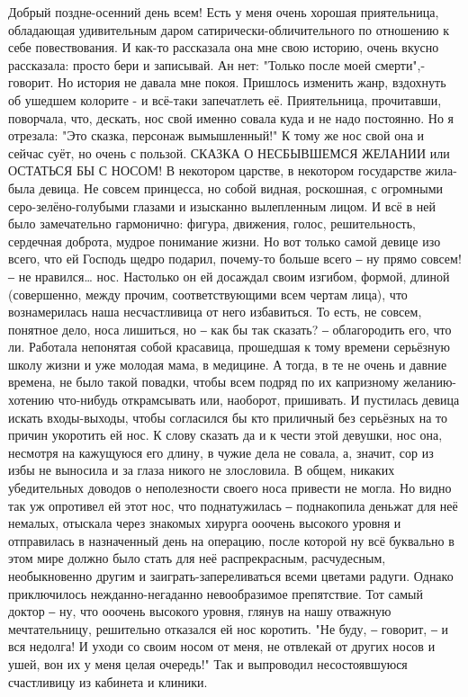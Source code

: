 Добрый поздне-осенний день всем!
Есть у меня очень хорошая приятельница, обладающая удивительным даром сатирически-обличительного по отношению к себе повествования. И как-то рассказала она мне свою историю, очень вкусно рассказала: просто бери и записывай. Ан нет: "Только после моей смерти",- говорит. Но история не давала мне покоя. Пришлось изменить жанр, вздохнуть об ушедшем колорите - и всё-таки запечатлеть её. Приятельница, прочитавши, поворчала, что, дескать, нос свой именно совала куда и не надо постоянно. Но я отрезала: "Это сказка, персонаж вымышленный!" К тому же нос свой она и сейчас суёт, но очень с пользой.
СКАЗКА О НЕСБЫВШЕМСЯ ЖЕЛАНИИ или ОСТАТЬСЯ БЫ С НОСОМ! 
В некотором царстве, в некотором государстве жила-была девица. Не совсем принцесса, но собой видная, роскошная, с огромными серо-зелёно-голубыми глазами и изысканно вылепленным лицом. И всё в ней было замечательно гармонично: фигура, движения, голос, решительность, сердечная доброта, мудрое понимание жизни. 
Но вот только самой девице изо всего, что ей Господь щедро подарил, почему-то больше всего ‒ ну прямо совсем! ‒ не нравился… нос. Настолько он ей досаждал своим изгибом, формой, длиной (совершенно, между прочим, соответствующими всем чертам лица), что вознамерилась наша несчастливица от него избавиться. То есть, не совсем, понятное дело, носа лишиться, но ‒ как бы так сказать? ‒ облагородить его, что ли. 
Работала непонятая собой красавица, прошедшая к тому времени серьёзную школу жизни и уже молодая мама, в медицине. А тогда, в те не очень и давние времена, не было такой повадки, чтобы всем подряд по их капризному желанию-хотению что-нибудь открамсывать или, наоборот, пришивать. И пустилась девица искать входы-выходы, чтобы согласился бы кто приличный без серьёзных на то причин укоротить ей нос. К слову сказать да и к чести этой девушки, нос она, несмотря на кажущуюся его длину, в чужие дела не совала, а, значит, сор из избы не выносила и за глаза никого не злословила. В общем, никаких убедительных доводов о неполезности своего носа привести не могла.  Но видно так уж опротивел ей этот нос, что поднатужилась ‒ поднакопила деньжат для неё немалых, отыскала через знакомых хирурга ооочень высокого уровня и отправилась в назначенный день на операцию, после которой ну всё буквально в этом мире должно было стать для неё распрекрасным, расчудесным, необыкновенно другим и заиграть-запереливаться всеми цветами радуги. 
Однако приключилось нежданно-негаданно невообразимое препятствие. Тот самый доктор ‒ ну, что ооочень высокого уровня, глянув на нашу отважную мечтательницу, решительно отказался ей нос коротить. "Не буду, ‒ говорит, ‒ и вся недолга! И уходи со своим носом от меня, не отвлекай от других носов и ушей, вон их у меня целая очередь!" Так и выпроводил несостоявшуюся счастливицу из кабинета и клиники. 
